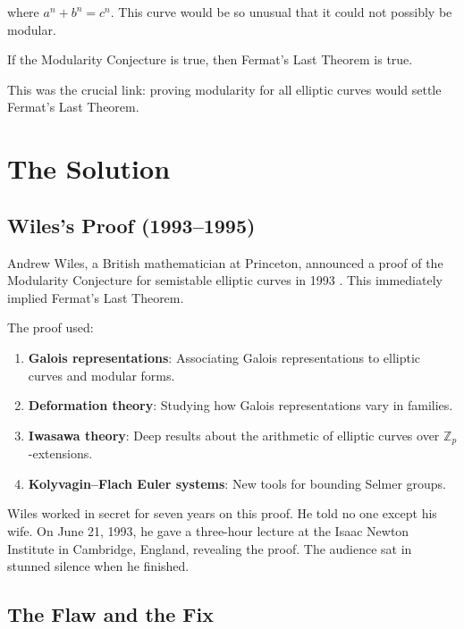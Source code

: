 where $a^n + b^n = c^n$. This curve would be so unusual that it could not possibly be modular.

\begin{theorem}
If the Modularity Conjecture is true, then Fermat's Last Theorem is true.
\end{theorem}

This was the crucial link: proving modularity for all elliptic curves would settle Fermat's Last Theorem.

\section{The Solution}

\subsection{Wiles's Proof (1993--1995)}

Andrew Wiles, a British mathematician at Princeton, announced a proof of the Modularity Conjecture for semistable elliptic curves in 1993 \cite{wiles1995}. This immediately implied Fermat's Last Theorem.

The proof used:

\begin{enumerate}
\item \textbf{Galois representations}: Associating Galois representations to elliptic curves and modular forms.
\item \textbf{Deformation theory}: Studying how Galois representations vary in families.
\item \textbf{Iwasawa theory}: Deep results about the arithmetic of elliptic curves over $\mathbb{Z}_p$-extensions.
\item \textbf{Kolyvagin--Flach Euler systems}: New tools for bounding Selmer groups.
\end{enumerate}

\begin{highlightbox}
Wiles worked in secret for seven years on this proof. He told no one except his wife. On June 21, 1993, he gave a three-hour lecture at the Isaac Newton Institute in Cambridge, England, revealing the proof. The audience sat in stunned silence when he finished.
\end{highlightbox}

\subsection{The Flaw and the Fix}

